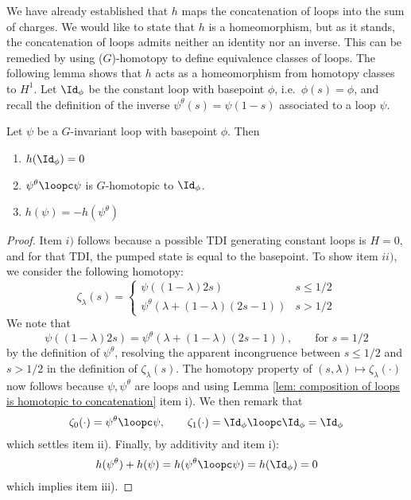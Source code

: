 We have already established that $h$ maps the concatenation of loops into the sum of charges. We would like to state that $h$ is a homeomorphism, but as it stands, the concatenation  of loops admits neither an identity nor an inverse. This can be remedied by using ($G$)-homotopy to define equivalence classes of loops. The following lemma shows that $h$ acts as a homeomorphism from homotopy classes to $H^1$. 
Let $\Id_\phi$ be the constant loop with basepoint $\phi$, i.e.\ $\phi(s)=\phi$, and recall the definition of the inverse ${\psi^{\theta}}(s)=\psi(1-s)$ associated to a loop  $\psi$.
\begin{lemma}\label{lem: inverse loop}
	Let $\psi$ be a $G$-invariant loop with basepoint $\phi$. Then
	\begin{enumerate}
		\item $h(\Id_\phi)=0$
		\item  ${\psi^{\theta}}\loopc\psi$ is $G$-homotopic to $\Id_\phi$.
		\item $h(\psi)=-h({\psi^{\theta}})$
	\end{enumerate}
\end{lemma}
\begin{proof}
	Item $i)$ follows because a possible TDI generating constant loops is $H=0$, and for that TDI, the pumped state is equal to the basepoint. 
	To show item $ii)$, we consider the following homotopy:
	\begin{equation}
		\zeta_\lambda(s) = \begin{cases} \psi((1-\lambda)2s) &  s\leq 1/2 \\
			{\psi^{\theta}}(\lambda+(1-\lambda)(2s-1))  &  s >1/2
		\end{cases}
	\end{equation}
	We note that
	$$
	\psi((1-\lambda) 2s)=  {\psi^{\theta}}(\lambda+(1-\lambda)(2s-1)), \qquad \text{for $s=1/2$}
	$$
	by the definition of ${\psi^{\theta}}$, resolving the apparent incongruence between $s\leq 1/2$ and $s>1/2$ in the definition of $\zeta_\lambda(s)$. 
	The homotopy property of $(s,\lambda)\mapsto \zeta_\lambda(\cdot)$ now follows because $\psi,{\psi^{\theta}}$ are loops and using Lemma \ref{lem: composition of loops is homotopic to concatenation} item i). 
	We then remark that
	$$
	\zeta_0(\cdot)= {\psi^{\theta}}\loopc\psi, \qquad  \zeta_1(\cdot)= \Id_\phi\loopc\Id_\phi=\Id_\phi
	$$
	which settles item ii). Finally, by additivity and item i):
	$$
	h({\psi^{\theta}})+h(\psi)= h({\psi^{\theta}}\loopc\psi)= h(\Id_\phi)= 0
	$$
	which implies item iii). 
\end{proof}


